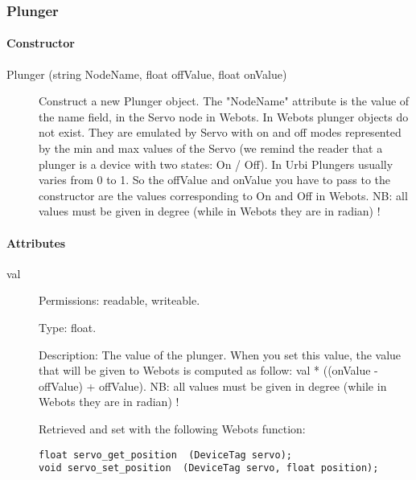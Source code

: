 \subsubsection{Plunger}
\label{webots.uobjects.robotdevices.plunger}%

\paragraph{Constructor}
\label{webots.uobjects.robotdevices.plunger.constructor}%

\noindent
\begin{description}
\item[{Plunger (string NodeName, float offValue, float onValue)}]
  Construct a new Plunger object. The "NodeName" attribute is the
  value of the name field, in the Servo node in Webots. In Webots
  plunger objects do not exist. They are emulated by Servo with on and
  off modes represented by the min and max values of the Servo (we
  remind the reader that a plunger is a device with two states: On /
  Off). In Urbi Plungers usually varies from 0 to 1. So the offValue
  and onValue you have to pass to the constructor are the values
  corresponding to On and Off in Webots. NB: all values must be given
  in degree (while in Webots they are in radian) !

\end{description}

\paragraph{Attributes}
\label{webots.uobjects.robotdevices.plunger.attributes}%

\noindent
\begin{description}
\item[{         val
 }]            Permissions: readable, writeable.


 Type: float.


 Description: The value of the plunger. When you set this value, the
 value that will be given to Webots is computed as follow: val *
 ((onValue -{} offValue) + offValue).  NB: all values must be given in
 degree (while in Webots they are in radian) !


          Retrieved and set with the following Webots function:


\begin{lstlisting}[firstnumber=1,]
float servo_get_position  (DeviceTag servo);
void servo_set_position  (DeviceTag servo, float position);
\end{lstlisting}
\end{description}

